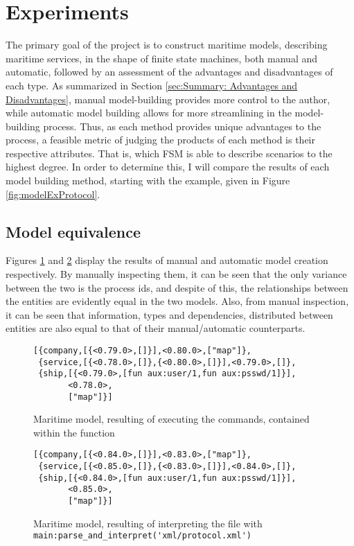 \section{Experiments}

The primary goal of the project is to construct maritime models, describing maritime services, in the shape of finite state machines, both manual and automatic, followed by an assessment of the advantages and disadvantages of each type. As summarized in Section \ref{sec:Summary: Advantages and Disadvantages}, manual model-building provides more control to the author, while automatic model building allows for more streamlining in the model-building process. Thus, as each method provides unique advantages to the process, a feasible metric of judging the products of each method is their respective attributes. That is, which FSM is able to describe scenarios to the highest degree. In order to determine this, I will compare the results of each model building method, starting with the example, given in Figure \ref{fig:modelExProtocol}.

\subsection{Model equivalence}

Figures \ref{fig:protocolManual} and \ref{fig:protocolAutomatic} display the results of manual and automatic model creation respectively. By manually inspecting them, it can be seen that the only variance between the two is the process ids, and despite of this, the relationships between the entities are evidently equal in the two models. Also, from manual inspection, it can be seen that information, types and dependencies, distributed between entities are also equal to that of their manual/automatic counterparts.

\begin{figure}[h]
  \begin{lstlisting}[keywordstyle={}]
[{company,[{<0.79.0>,[]}],<0.80.0>,["map"]},
 {service,[{<0.78.0>,[]},{<0.80.0>,[]}],<0.79.0>,[]},
 {ship,[{<0.79.0>,[fun aux:user/1,fun aux:psswd/1]}],
       <0.78.0>,
       ["map"]}]
  \end{lstlisting}
  \caption{Maritime model, resulting of executing the commands, contained within the function }
  \label{fig:protocolManual}
\end{figure}

\begin{figure}[h]
  \begin{lstlisting}[keywordstyle={}]
[{company,[{<0.84.0>,[]}],<0.83.0>,["map"]},
 {service,[{<0.85.0>,[]},{<0.83.0>,[]}],<0.84.0>,[]},
 {ship,[{<0.84.0>,[fun aux:user/1,fun aux:psswd/1]}],
       <0.85.0>,
       ["map"]}]
  \end{lstlisting}
  \caption{Maritime model, resulting of interpreting the file  with \lstinline{main:parse_and_interpret('xml/protocol.xml')}}
  \label{fig:protocolAutomatic}
\end{figure}

